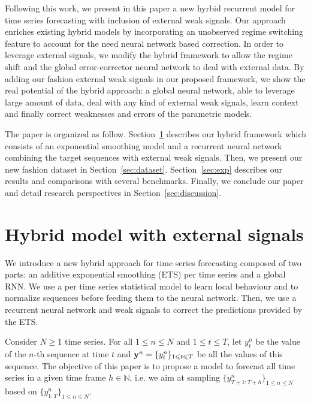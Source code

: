 \documentclass{article} %
\newcommand{\ts}{y}
\newcommand{\fullts}{{\bf \ts}}
\newcommand{\lag}{h}
\begin{document}
Following this work, we present in this paper a new hyrbid recurrent model for time series forecasting with inclusion of external weak signals. %
Our approach enriches existing hybrid models  by incorporating an unobserved regime switching feature to account for the need neural network based correction. In order to leverage external signals, we modify the hybrid framework to allow the regime shift and the  global error-corrector neural network to deal with external data. By adding our fashion external weak signals in our proposed framework, we show the real potential of the hybrid approach: a global neural network, able to leverage large amount of data, deal with any kind of external weak signals, learn context and finally correct weaknesses and errors of the parametric models.

The paper is organized as follow. Section~\ref{sec:hybrid} describes our hybrid framework which consists of an exponential smoothing model and a recurrent neural network combining the target sequences with external weak signals. Then, we present our new fashion dataset in Section~\ref{sec:dataset}. Section~\ref{sec:exp} describes our results and comparisons with several benchmarks. Finally, we conclude our paper and detail research perspectives in Section~\ref{sec:discussion}.


\section{Hybrid model with external signals}
\label{sec:hybrid}
We introduce a new hybrid approach for time series forecasting  composed of two parts: an additive exponential smoothing (ETS) per time series and a global RNN. We use a per time series statistical model to learn local behaviour and to normalize sequences before feeding them to the neural network. Then, we use a recurrent neural network and weak signals to correct the predictions provided by the ETS.

Consider $N\geqslant 1$ time series. For all $1\leqslant n \leqslant N$ and $1\leqslant t \leqslant T$, let $\ts_t^n$ be the value of the $n$-th sequence at time $t$ and  $\fullts^n = \{\ts_t^n\}_{1\leqslant t \leqslant T}$ be all the values of this sequence.   The objective of this paper is to propose a model to  forecast all time series in a given time frame  $\lag \in \mathbb{N}$, i.e. we aim at sampling $\{\ts^n_{T+1:T+\lag}\}_{1\leqslant n \leqslant N}$ based on $\{\ts^n_{1:T}\}_{1\leqslant n \leqslant N}$.
\end{document}
